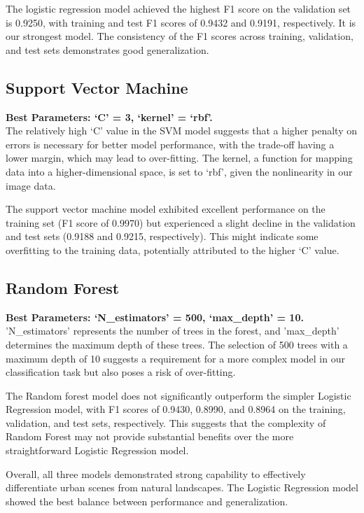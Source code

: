 \documentclass[11pt]{article}
\begin{document}
The logistic regression model achieved the highest F1 score on the validation set is 0.9250, with training and test F1 scores of 0.9432 and 0.9191, respectively. It is our strongest model. The consistency of the F1 scores across training, validation, and test sets demonstrates good generalization.

\subsection{Support Vector Machine}
\textbf{Best Parameters: ‘C’ = 3, ‘kernel’ = ‘rbf’.}\\
The relatively high ‘C’ value in the SVM model suggests that a higher penalty on errors is necessary for better model performance, with the trade-off having a lower margin, which may lead to over-fitting. The kernel, a function for mapping data into a higher-dimensional space, is set to ‘rbf’, given the nonlinearity in our image data.

The support vector machine model exhibited excellent performance on the training set (F1 score of 0.9970) but experienced a slight decline in the validation and test sets (0.9188 and 0.9215, respectively). This might indicate some overfitting to the training data, potentially attributed to the higher ‘C’ value.

\subsection{Random Forest}
\textbf{Best Parameters: ‘N\_estimators’ = 500, ‘max\_depth’ = 10. }\\
'N\_estimators' represents the number of trees in the forest, and 'max\_depth' determines the maximum depth of these trees. The selection of 500 trees with a maximum depth of 10 suggests a requirement for a more complex model in our classification task but also poses a risk of over-fitting.

The Random forest model does not significantly outperform the simpler Logistic Regression model, with F1 scores of 0.9430, 0.8990, and 0.8964 on the training, validation, and test sets, respectively. This suggests that the complexity of Random Forest may not provide substantial benefits over the more straightforward Logistic Regression model.

Overall, all three models demonstrated strong capability to effectively differentiate urban scenes from natural landscapes. The Logistic Regression model showed the best balance between performance and generalization. 
\end{document}
